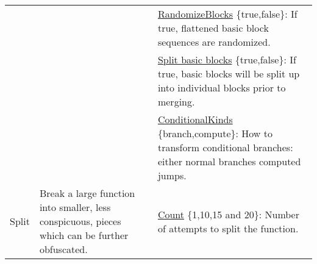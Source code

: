 \begin{table*}[!hp]
\begin{tabular}{|p{2.25cm}|p{4cm}|p{11cm}|}
                                     &                                                                                                                                                                                                                                                                                                         & \underline{RandomizeBlocks} \{true,false\}: If true, flattened basic block sequences are randomized.                                                                                                                                                                                                                                                                 \\ \cline{3-3} 
                                     &                                                                                                                                                                                                                                                                                                         & \underline{Split basic blocks} \{true,false\}: If true, basic blocks will be split up into individual blocks prior to merging.                                                                                                                                                                                                                                 \\ \cline{3-3} 
                                     &                                                                                                                                                                                                                                                                                                         & \underline{ConditionalKinds} \{branch,compute\}: How to transform conditional branches: either normal branches computed jumps.                                                                                                                                                                                                          \\ \hline
\multirow{2}{*}{Split}               & \multirow{2}{4cm}{Break a large function into smaller, less conspicuous, pieces which can be further obfuscated. }                                                                                                                                                                                                           & \underline{Count} \{1,10,15 and 20\}: Number of attempts to split the function.                                                                                                                                                                                                                                                                   \\ \cline{3-3} 

\end{tabular}
\end{table*}

